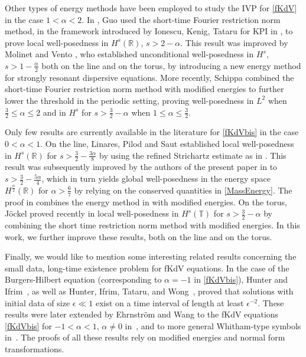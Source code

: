 \documentclass{amsart}
\theoremstyle{definition}
\theoremstyle{remark}
\numberwithin{equation}{section}
\begin{document}
Other types of energy methods have been employed to study the IVP for \eqref{fKdV} in the case $1<\alpha<2$. In \cite{Guo12}, Guo used the short-time Fourier restriction norm method, in the framework introduced by Ionescu, Kenig, Tataru for KPI in \cite{IKT08}, to prove local well-posedness in $H^s(\mathbb R)$, $s>2-\alpha$. This result was improved by Molinet and Vento \cite{MV}, who established unconditional well-posedness in $H^s$, $s>1-\frac{\alpha}2$ both on the line and on the torus, by introducing a new energy method for strongly resonant dispersive equations.  More recently, Schippa \cite{Schip20} combined the short-time Fourier restriction norm method with modified energies to further lower the threshold in the periodic setting, proving well-posedness in $L^2$ when $\frac32 \le \alpha \le 2$ and in $H^s$ for $s>\frac32-\alpha$ when $1 \le \alpha \le \frac32$. 

Only few results are currently available in the literature for \eqref{fKdVbis} in the case $0<\alpha<1$. On the line, Linares, Pilod and Saut \cite{LiPiSa14} established local well-posedness in $H^s(\mathbb R)$ for $s>\frac32-\frac{3\alpha}8$ by using the refined Strichartz estimate as in \cite{KoTz03,KK03}. This result was subsequently improved by the authors of the present paper in \cite{MPV} to $s>\frac32-\frac{5\alpha}4$, which in turn yields global well-posedness in the energy space $H^{\frac{\alpha}2}(\mathbb R)$ for $\alpha>\frac67$ by relying on the conserved quantities in \eqref{MassEnergy}. The proof in \cite{MPV} combines the energy method in \cite{MV} with modified energies. On the torus, J\"ockel proved recently in \cite{Joc24} local well-posedness in $H^s(\mathbb T)$ for $s>\frac32-\alpha$ by combining the short time restriction norm method with modified energies. In this work, we further improve these results, both on the line and on the torus. 

Finally, we would like to mention some interesting related results concerning the small data, long-time existence problem for fKdV equations. In the case of the Burgers-Hilbert equation (corresponding to $\alpha=-1$ in \eqref{fKdVbis}), Hunter and Ifrim~\cite{HI}, as well as Hunter, Ifrim, Tataru, and Wong~\cite{HITW}, proved that solutions with initial data of size $\epsilon \ll 1$ exist on a time interval of length at least $\epsilon^{-2}$. These results were later extended by Ehrnstr\"om and Wang to the fKdV equations \eqref{fKdVbis} for $-1<\alpha<1$, $\alpha \neq 0$ in~\cite{EhWa19}, and to more general Whitham-type symbols in~\cite{EhWa22}. The proofs of all these results rely on modified energies and normal form transformations. 
\end{document}
